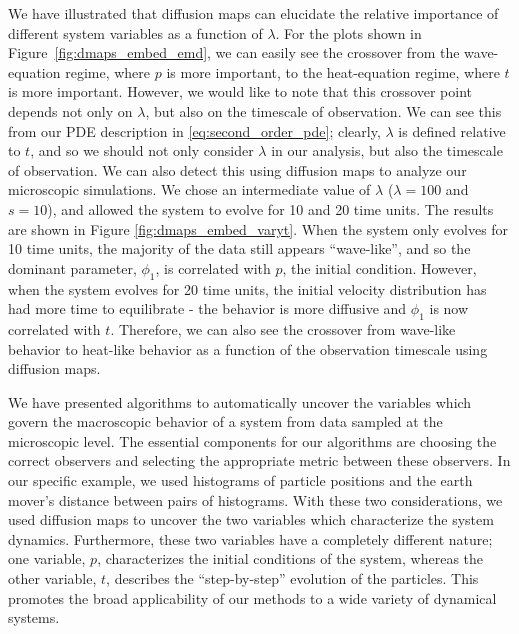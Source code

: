 \documentclass[prl, reprint, final, showkeys]{revtex4-1}
\begin{document}
We have illustrated that diffusion maps can elucidate the relative importance of different system variables as a function of $\lambda$.
%
For the plots shown in Figure~\ref{fig:dmaps_embed_emd}, we can easily see the crossover from the wave-equation regime, where $p$ is more important, to the heat-equation regime, where $t$ is more important. 
%
However, we would like to note that this crossover point depends not only on $\lambda$, but also on the timescale of observation.
%
We can see this from our PDE description in \eqref{eq:second_order_pde};
clearly, $\lambda$ is defined relative to $t$, and so we should not only consider $\lambda$ in our analysis, but also the timescale of observation.
%
We can also detect this using diffusion maps to analyze our microscopic simulations.
%
We chose an intermediate value of $\lambda$ ($\lambda=100$ and $s=10$), and allowed the system to evolve for 10 and 20 time units. 
%
The results are shown in Figure \ref{fig:dmaps_embed_varyt}.
%
When the system only evolves for 10 time units, the majority of the data still appears ``wave-like'', and so the dominant parameter, $\phi_1$, is correlated with $p$, the initial condition.
%
However, when the system evolves for 20 time units, the initial velocity distribution has had more time to equilibrate - the behavior is more diffusive and $\phi_1$ is now correlated with $t$. 
%
Therefore, we can also see the crossover from wave-like behavior to heat-like behavior as a function of the observation timescale using diffusion maps.

We have presented algorithms to automatically uncover the variables which govern the macroscopic behavior of a system from data sampled at the microscopic level.
%
The essential components for our algorithms are choosing the correct observers and selecting the appropriate metric between these observers.
%
In our specific example, we used histograms of particle positions and the earth mover's distance between pairs of histograms.
%
With these two considerations, we used diffusion maps to uncover the two variables which characterize the system dynamics.
%
Furthermore, these two variables have a completely different nature;
one variable, $p$, characterizes the initial conditions of the system, whereas the other variable, $t$, describes the ``step-by-step'' evolution of the particles. 
%
This promotes the broad applicability of our methods to a wide variety of dynamical systems. 




%
\end{document}
